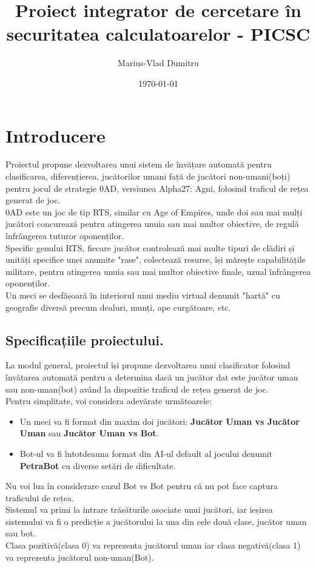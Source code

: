 \documentclass[12pt, a4paper, twoside, romanian]{teza-upb}
\author{Marius-Vlad Dumitru}
\date{\today}
\title{Proiect integrator de cercetare în securitatea calculatoarelor - PICSC}
\begin{document}
    \maketitle
    \chapter{Introducere}
        Proiectul propune dezvoltarea unui sistem de învățare automată pentru clasificarea, diferențierea, jucătorilor umani față de jucători non-umani(boți) pentru jocul de strategie 0AD, versiunea Alpha27: Agni, folosind traficul de rețea generat de joc.\\
        0AD este un joc de tip RTS, similar cu Age of Empires, unde doi sau mai mulți jucători concurează pentru atingerea unuia sau mai multor obiective, de regulă înfrângerea tuturor oponenților.\\
        Specific genului RTS, fiecare jucător controlează mai multe tipuri de clădiri și unități specifice unei anumite "rase", colectează resurse, își mărește capabilitățile militare, pentru atingerea unuia sau mai multor obiective finale, uzual înfrângerea oponenților.\\
        Un meci se desfășoară în interiorul unui mediu virtual denumit "hartă" cu geografie diversă precum dealuri, munți, ape curgătoare, etc.

        \section{Specificațiile proiectului.}
            La modul general, proiectul își propune dezvoltarea unui clasificator folosind învățarea automată pentru a determina dacă un jucător dat este jucător uman sau non-uman(bot) având la dispozitie traficul de rețea generat de joc.\\
            Pentru simplitate, voi considera adevărate următoarele:
                \begin{itemize}
                    \item Un meci va fi format din maxim doi jucători: \textbf{Jucător Uman vs Jucător Uman} sau \textbf{Jucător Uman vs Bot}.

                    \item Bot-ul va fi întotdeauna format din AI-ul default al jocului denumit \textbf{PetraBot} cu diverse setări de dificultate.
                \end{itemize}
            Nu voi lua în considerare cazul Bot vs Bot pentru că nu pot face captura traficului de rețea.\\
            Sistemul va primi la intrare trăsăturile asociate unui jucători, iar ieșirea sistemului va fi o predicție a jucătorului la una din cele două clase, jucător uman sau bot.\\
            Clasa pozitivă(clasa 0) va reprezenta jucătorul uman iar clasa negativă(clasa 1) va reprezenta jucătorul non-uman(Bot).
\end{document}
